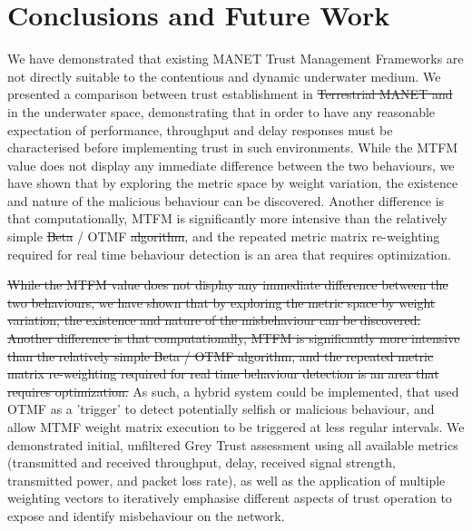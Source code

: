 \documentclass[conference]{IEEEtran}
\providecommand{\DIFadd}[1]{{\protect\color{blue}\uwave{#1}}} %
\providecommand{\DIFdel}[1]{{\protect\color{red}\sout{#1}}}                      %
\providecommand{\DIFaddbegin}{} %
\providecommand{\DIFaddend}{} %
\providecommand{\DIFdelbegin}{} %
\providecommand{\DIFdelend}{} %
\begin{document}
\section{Conclusions and Future Work}
We have demonstrated that existing MANET Trust Management Frameworks are not directly suitable to the contentious and dynamic underwater medium.
We presented a comparison between trust establishment in \DIFdelbegin \DIFdel{Terrestrial MANET and }\DIFdelend \DIFaddbegin \DIFadd{MANETs }\DIFaddend in the underwater space, demonstrating that in order to have any reasonable expectation of performance, throughput and delay responses must be characterised before implementing trust in such environments. 
While the MTFM value does not display any immediate difference between the two behaviours, we have shown that by exploring the metric space by weight variation, the existence and nature of the malicious behaviour can be discovered.
Another difference is that computationally, MTFM is significantly more intensive than the relatively simple \DIFdelbegin \DIFdel{Beta }\DIFdelend \DIFaddbegin \DIFadd{Hermes }\DIFaddend / OTMF \DIFdelbegin \DIFdel{algorithm}\DIFdelend \DIFaddbegin \DIFadd{algorithms}\DIFaddend , and the repeated metric matrix re-weighting required for real time behaviour detection is an area that requires optimization. 

\DIFdelbegin \DIFdel{While the MTFM value does not display any immediate difference between the two behaviours, we have shown that by exploring the metric space by weight variation, the existence and nature of the misbehaviour can be discovered.
Another difference is that computationally, MTFM is significantly more intensive than the relatively simple Beta / OTMF algorithm, and the repeated metric matrix re-weighting required for real time behaviour detection is an area that requires optimization. 
}\DIFdelend As such, a hybrid system could be implemented, that used OTMF as a 'trigger' to detect potentially selfish or malicious behaviour, and allow MTMF weight matrix execution to be triggered at less regular intervals.
We demonstrated initial, unfiltered Grey Trust assessment using all available metrics (transmitted and received throughput, delay, received signal strength, transmitted power, and packet loss rate), as well as the application of multiple weighting vectors to iteratively emphasise different aspects of trust operation to expose and identify misbehaviour on the network.
\end{document}
